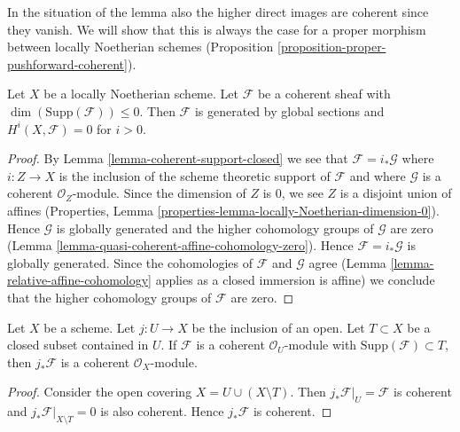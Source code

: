 \noindent
In the situation of the lemma also the higher direct images are
coherent since they vanish.
We will show that this is always the case for a proper morphism
between locally Noetherian schemes
(Proposition \ref{proposition-proper-pushforward-coherent}).

\begin{lemma}
\label{lemma-coherent-support-dimension-0}
Let $X$ be a locally Noetherian scheme. Let $\mathcal{F}$
be a coherent sheaf with $\dim(\text{Supp}(\mathcal{F})) \leq 0$.
Then $\mathcal{F}$ is generated by global sections and
$H^i(X, \mathcal{F}) = 0$ for $i > 0$.
\end{lemma}

\begin{proof}
By Lemma \ref{lemma-coherent-support-closed} we see that
$\mathcal{F} = i_*\mathcal{G}$ where $i : Z \to X$ is the inclusion
of the scheme theoretic support of $\mathcal{F}$ and where $\mathcal{G}$
is a coherent $\mathcal{O}_Z$-module. Since the dimension of $Z$ is
$0$, we see $Z$ is a disjoint union of affines (Properties, Lemma
\ref{properties-lemma-locally-Noetherian-dimension-0}).
Hence $\mathcal{G}$ is globally generated and the higher
cohomology groups of $\mathcal{G}$ are zero
(Lemma \ref{lemma-quasi-coherent-affine-cohomology-zero}).
Hence $\mathcal{F} = i_*\mathcal{G}$ is globally generated.
Since the cohomologies of $\mathcal{F}$ and $\mathcal{G}$ agree
(Lemma \ref{lemma-relative-affine-cohomology} applies as a
closed immersion is affine)
we conclude that the higher cohomology groups of $\mathcal{F}$ are zero.
\end{proof}

\begin{lemma}
\label{lemma-pushforward-coherent-on-open}
Let $X$ be a scheme. Let $j : U \to X$ be the inclusion of an open.
Let $T \subset X$ be a closed subset contained in $U$.
If $\mathcal{F}$ is a coherent $\mathcal{O}_U$-module
with $\text{Supp}(\mathcal{F}) \subset T$, then
$j_*\mathcal{F}$ is a coherent $\mathcal{O}_X$-module.
\end{lemma}

\begin{proof}
Consider the open covering $X = U \cup (X \setminus T)$.
Then $j_*\mathcal{F}|_U = \mathcal{F}$ is coherent and
$j_*\mathcal{F}|_{X \setminus T} = 0$ is also coherent.
Hence $j_*\mathcal{F}$ is coherent.
\end{proof}














